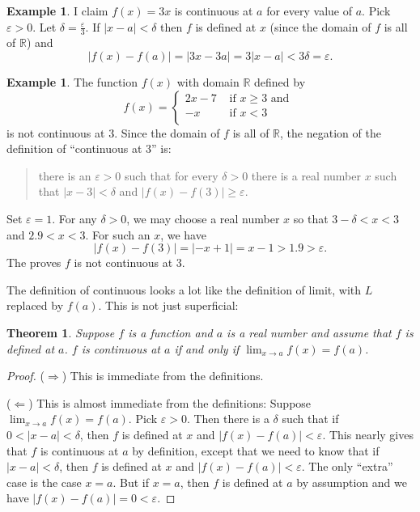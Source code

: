 \documentclass[12pt]{amsart}
\def\d{\delta}
\def\e{\varepsilon}
\newcommand{\R}{{\mathbb{R}}}
\numberwithin{equation}{section}
\theoremstyle{plain} %
\newtheorem{thm}[equation]{Theorem}
\theoremstyle{definition}
\newtheorem{ex}[equation]{Example}
\theoremstyle{remark}
\begin{document}
\begin{ex} I claim $f(x) = 3x$ is continuous at $a$ for every value of $a$. Pick $\e > 0$. Let $\d = \frac{\e}{3}$. If $|x - a| < \d$ then $f$ is defined at $x$ (since the domain
  of $f$ is all of $\R$) and
  $$
  |f(x) - f(a)| =
  |3x-3a| = 3|x-a| < 3 \d = \e.
  $$
\end{ex}

\begin{ex} The function $f(x)$ with domain $\R$ defined by
$$
f(x) = \begin{cases}
2x - 7 & \text{ if $x \geq 3$ and } \\
-x  & \text{ if $x < 3$} \\
\end{cases}
$$
is not continuous at $3$. Since the domain of $f$ is all of $\R$, the negation of the definition of ``continuous at $3$'' is:
\begin{quote}
there is an $\e > 0$ such that for every $\d > 0$ there is a real number $x$ such that $|x-3| < \d$ and $|f(x) - f(3)| \geq \e$. 
\end{quote}

Set $\e = 1$. For any $\d > 0$, we may choose a real number $x$ so that $3 - \d < x < 3$ and $2.9 < x < 3$. For such an $x$, we have
$$
|f(x) - f(3)| = |-x+1| = x-1 > 1.9 > \e.
$$
The proves $f$ is not continuous at $3$.
\end{ex}



The definition of continuous looks a lot like the definition of limit, with $L$ replaced by $f(a)$. This is not just superficial:

\begin{thm} \label{thm36}
Suppose $f$ is a function and $a$ is a real number and assume that $f$ is defined at $a$.  $f$ is continuous at   $a$ if and only if $\lim_{x \to a} f(x) = f(a)$.
\end{thm}



\begin{proof} ($\Rightarrow$) This is immediate from the definitions.

($\Leftarrow$) This is almost immediate from the definitions: 
Suppose $\lim_{x \to a} f(x) = f(a)$. Pick $\e>0$. Then there is a $\d$ such that if $0 < |x - a| < \d$, then $f$ is defined at $x$ and $|f(x) - f(a)| < \e$. This nearly gives
that $f$ is continuous at $a$ by definition, except that we need to know that if $|x - a| < \d$, then $f$ is defined at $x$ and $|f(x) - f(a)| < \e$. The only ``extra''
case is the case $x = a$. But if $x = a$, then $f$ is defined at $a$ by assumption and we have $|f(x) -f(a)| = 0 < \e$.
\end{proof}
\end{document}
